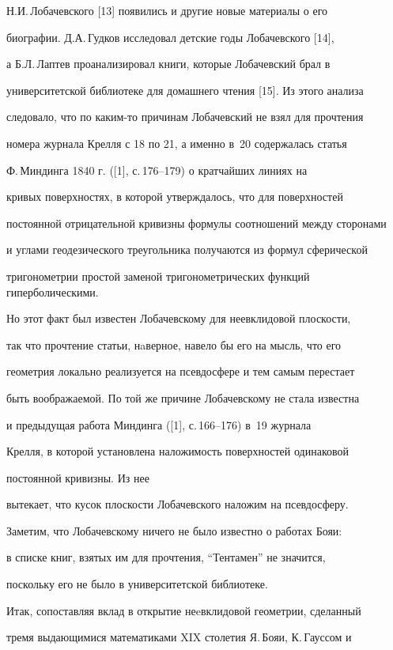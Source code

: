 Н.И.\,Лобачевского [13] появились и другие новые материалы о его 


биографии. Д.А.\,Гудков исследовал детские годы Лобачевского [14], 


а Б.Л.\,Лаптев проанализировал книги, которые Лобачевский брал в 


университетской библиотеке для домашнего чтения [15]. Из этого анализа 


следовало, что по каким-то причинам Лобачевский не взял для прочтения 


номера журнала Крелля с 18 по 21, а именно в \No\,20 содержалась статья 


Ф.\,Миндинга 1840 г. ([1], с.\,176--179) о кратчайших линиях на 


кривых поверхностях, в которой утверждалось, что для поверхностей 


постоянной отрицательной кривизны формулы соотношений между сторонами 


и углами геодезического треугольника получаются из формул сферической 


тригонометрии простой заменой тригонометрических функций гиперболическими. 


Но этот факт был известен Лобачевскому для неевклидовой плоскости, 


так что прочтение статьи, нaверное, навело бы его на мысль, что его 


геометрия локально реализуется на псевдосфере и тем самым перестает 


быть воображаемой. По той же причине Лобачевскому не стала известна 


и предыдущая работа Миндинга ([1], с.\,166--176) в \No\,19 журнала 


Крелля, в которой установлена наложимость поверхностей одинаковой


постоянной кривизны. Из нее


вытекает, что кусок плоскости Лобачевского наложим на псевдосферу.


Заметим, что Лобачевскому ничего не было известно о работах Бояи: 


в списке книг, взятых им для прочтения, ``Тентамен'' не значится, 


поскольку его не было в университетской библиотеке.





Итак, сопоставляя вклад в открытие неeвклидовой геометрии, сделанный 


тремя выдающимися математиками XIX столетия Я.\,Бояи, К.\,Гауссом и 


